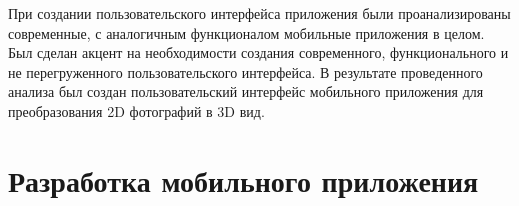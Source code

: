 При создании пользовательского интерфейса приложения были проанализированы современные, с аналогичным функционалом мобильные приложения в целом. Был сделан акцент на необходимости создания современного, функционального и не перегруженного пользовательского интерфейса. В результате проведенного анализа был создан пользовательский интерфейс мобильного приложения для преобразования 2D фотографий в 3D вид.

\section{Разработка мобильного приложения}




